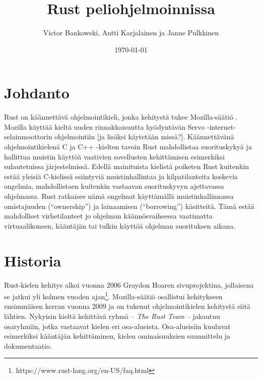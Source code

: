 \documentclass[finnish]{tktltiki2}
\title{Rust peliohjelmoinnissa}
\author{Victor Bankowski, Antti Karjalainen ja Janne Pulkkinen}
\date{\today}
\theoremstyle{definition}
\theoremstyle{remark}
\begin{document}

\frontmatter      %

\maketitle        %
\makeabstract     %

\tableofcontents  %


\mainmatter       %

\section{Johdanto}

Rust on käännettävä ohjelmointikieli, jonka kehitystä tukee Mozilla-säätiö \cite{servo}. Mozilla käyttää kieltä uuden rinnakkaisuutta hyödyntävän Servo -internet-selainmoottorin ohjelmointiin [ja lisäksi käytetään missä?]. Käännettävänä ohjelmointikielenä C ja C++ -kielten tavoin Rust mahdollistaa suorituskykyä ja hallittua muistin käyttöä vaativien sovellusten kehittämisen esimerkiksi sulautetuissa järjestelmissä. Edellä mainituista kielistä poiketen Rust kuitenkin estää yleisiä C-kielissä esiintyviä muistinhallintaa ja kilpatilanteita koskevia ongelmia, mahdollistaen kuitenkin vastaavan suorituskyvyn ajettavassa ohjelmassa. Rust ratkaisee nämä ongelmat käyttämällä muistinhallinnassa omistajuuden (“ownership”) ja lainaamisen (“borrowing”) käsitteitä. Tämä estää mahdolliset virhetilanteet jo ohjelman käännösvaiheessa vaatimatta virtuaalikoneen, kääntäjän tai tulkin käyttöä ohjelman suorituksen aikana.

\section{Historia}

Rust-kielen kehitys alkoi vuonna 2006 Graydon Hoaren sivuprojektina, jollaisena se jatkui yli kolmen vuoden ajan\footnote{https://www.rust-lang.org/en-US/faq.html}. Mozilla-säätiö osallistui kehitykseen ensimmäisen kerran vuonna 2009 ja on tukenut ohjelmointikielen kehitystä siitä lähtien. Nykyisin kieltä kehittävä ryhmä -- \textit{The Rust Team} -- jakautuu osaryhmiin, jotka vastaavat kielen eri osa-alueista. Osa-alueisiin kuuluvat esimerkiksi kääntäjän kehittäminen, kielen ominaisuuksien suunnittelu ja dokumentaatio.
\end{document}
